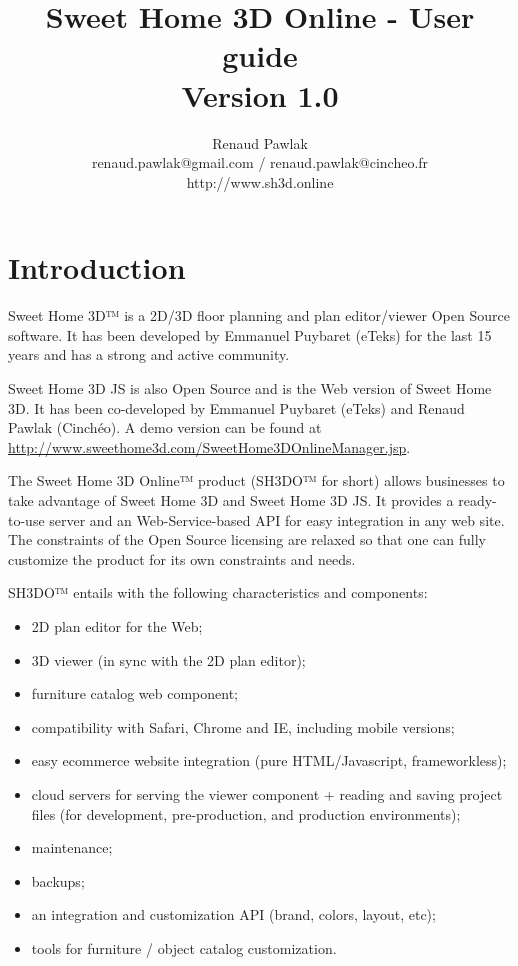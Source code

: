\documentclass[a4paper]{report}
\begin{document}
\title{Sweet Home 3D Online - User guide\\{\large Version 1.0}}
\author{%
Renaud Pawlak\\
{\normalsize renaud.pawlak@gmail.com / renaud.pawlak@cincheo.fr}\\
{\normalsize http://www.sh3d.online}\\
}%
\date{}
\maketitle

\tableofcontents

\chapter*{Introduction}

Sweet Home 3D™ is a 2D/3D floor planning and plan editor/viewer Open Source software. It has been developed by Emmanuel Puybaret (eTeks) for the last 15 years and has a strong and active community. 

Sweet Home 3D JS is also Open Source and is the Web version of Sweet Home 3D. It has been co-developed by Emmanuel Puybaret (eTeks) and Renaud Pawlak (Cinchéo). A demo version can be found at \url{http://www.sweethome3d.com/SweetHome3DOnlineManager.jsp}.

The Sweet Home 3D Online™ product (SH3DO™ for short) allows businesses to take advantage of Sweet Home 3D and Sweet Home 3D JS. It provides a ready-to-use server and an Web-Service-based API for easy integration in any web site. The constraints of the Open Source licensing are relaxed so that one can fully customize the product for its own constraints and needs. 

SH3DO™ entails with the following characteristics and components:

\begin{itemize}
\item 2D plan editor for the Web;
\item 3D viewer (in sync with the 2D plan editor);
\item furniture catalog web component;
\item compatibility with Safari, Chrome and IE, including mobile versions;
\item easy ecommerce website integration (pure HTML/Javascript, frameworkless);
\item cloud servers for serving the viewer component + reading and saving project files (for development, pre-production, and production environments);
\item maintenance;
\item backups;
\item an integration and customization API (brand, colors, layout, etc);
\item tools for furniture / object catalog customization.
\end{itemize}
\end{document}
